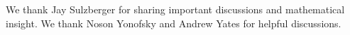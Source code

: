We thank Jay Sulzberger for sharing important discussions and mathematical insight. We thank Noson Yonofsky and Andrew Yates for helpful discussions.
